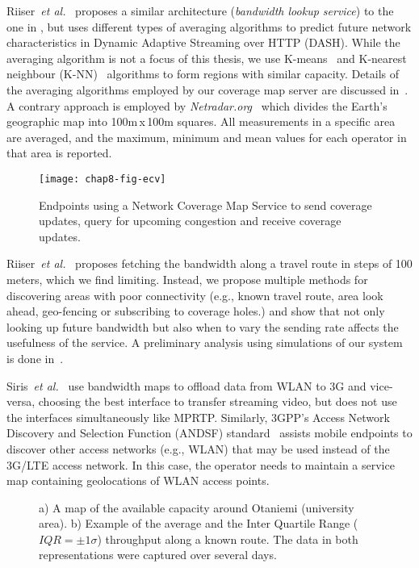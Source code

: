 Riiser~\emph{et al.}~\cite{6012045} proposes a similar architecture (\emph{bandwidth lookup
service}) to the one in , but uses different types of
averaging algorithms to predict future network characteristics in Dynamic
Adaptive Streaming over HTTP (DASH). While the averaging algorithm is not a
focus of this thesis, we use K-means~\cite{Kanungo:2002:LSA:513400.513402} and
K-nearest neighbour (K-NN)~\cite{Iwerks:2003:CKN:1315451.1315496} algorithms to
form regions with similar capacity. Details of the averaging algorithms
employed by our coverage map server are discussed in~\cite{sharmistha-thesis}.
A contrary approach is employed by \emph{Netradar.org}~\cite{6576402} which
divides the Earth's geographic map into 100m\,x\,100m squares. All measurements in a
specific area are averaged, and the maximum, minimum and mean values for
each operator in that area is reported.

\begin{figure}[!t]
\texttt{[image: chap8-fig-ecv]}
  \caption{Endpoints using a Network Coverage Map Service to send coverage
  updates, query for upcoming congestion and receive coverage updates.}
\label{fig:cc:ecv}
\end{figure}

Riiser~\emph{et al.}~\cite{Riiser:2012:2240136} proposes fetching the bandwidth along a travel
route in steps of 100 meters, which we find limiting. Instead, we propose
multiple methods for discovering areas with poor connectivity (e.g., known
travel route, area look ahead, geo-fencing or subscribing to coverage holes.)
and show that not only looking up future bandwidth but also when to vary the
sending rate affects the usefulness of the service. A preliminary analysis
using simulations of our system is done in~\cite{Curcio:glass}.

Siris~\emph{et al.}~\cite{siris2013improving} use bandwidth maps to offload
data from WLAN to 3G and vice-versa, choosing the best interface to transfer
streaming video, but does not use the interfaces simultaneously like MPRTP.
Similarly, 3GPP's Access Network Discovery and Selection Function (ANDSF)
standard~\cite{3gpp.andsf} assists mobile endpoints to discover other access
networks (e.g., WLAN) that may be used instead of the 3G/LTE access network.
In this case, the operator needs to maintain a service map containing
geolocations of WLAN access points.

\begin{figure}[!t]
  \centerline{
  }
  \centerline{
  }
  \caption{a) A map of the available capacity around Otaniemi (university
  area). b) Example of the average and the Inter Quartile Range
  ($IQR=\pm1\sigma$) throughput along a known route. The data in both
  representations were captured over several days.}
  \label{fig:glass:map}
\end{figure}


